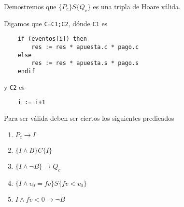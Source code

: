 \documentclass[../document.tex]{subfiles}
\begin{document}
Demostremos que $\{P_c\}S\{Q_c\}$ es una tripla de Hoare válida.

Digamos que \verb+C=C1;C2+, dónde \verb+C1+ es
\begin{verbatim}
    if (eventos[i]) then
        res := res * apuesta.c * pago.c
    else
        res := res * apuesta.s * pago.s
    endif
\end{verbatim}

y \verb+C2+ es
\begin{verbatim}
    i := i+1
\end{verbatim}

Para ser válida deben ser ciertos los siguientes predicados
\begin{enumerate}
    \item $P_c \to I$
    \item $\{I \land B\}C\{I\}$
    \item $\{I \land \neg B\} \to Q_c$
    \item $\{I \land v_0 = fv\} S \{fv < v_0\}$
    \item $I \land fv<0 \to \neg B$
\end{enumerate}
\end{document}
